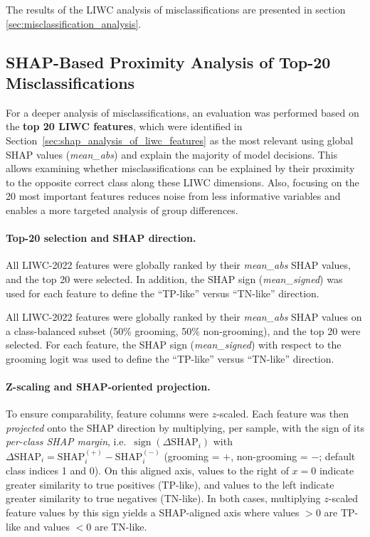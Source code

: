 The results of the LIWC analysis of misclassifications are presented in section \ref{sec:misclassification_analysis}.

\subsection{SHAP-Based Proximity Analysis of Top-20 Misclassifications}


For a deeper analysis of misclassifications, an evaluation was performed based on the \textbf{top 20 LIWC features}, which were identified in Section~\ref{sec:shap_analysis_of_liwc_features} as the most relevant using global SHAP values (\emph{mean\_abs}) and explain the majority of model decisions. This allows examining whether misclassifications can be explained by their proximity to the opposite correct class along these LIWC dimensions. Also, focusing on the 20 most important features reduces noise from less informative variables and enables a more targeted analysis of group differences.

\paragraph{Top-20 selection and SHAP direction.}
All LIWC-2022 features were globally ranked by their \emph{mean\_abs} SHAP values, and the top 20 were selected. In addition, the SHAP sign (\emph{mean\_signed}) was used for each feature to define the “TP-like” versus “TN-like” direction.

All LIWC-2022 features were globally ranked by their \emph{mean\_abs} SHAP values on a class-balanced subset (50\% grooming, 50\% non-grooming), and the top 20 were selected. For each feature, the SHAP sign (\emph{mean\_signed}) with respect to the grooming logit was used to define the “TP-like” versus “TN-like” direction.

\paragraph{Z-scaling and SHAP-oriented projection.}
To ensure comparability, feature columns were $z$-scaled. Each feature was then \emph{projected} onto the SHAP direction by multiplying, per sample, with the sign of its \emph{per-class SHAP margin}, i.e.\ $\operatorname{sign}(\Delta\mathrm{SHAP}_i)$ with
$\Delta\mathrm{SHAP}_i = \mathrm{SHAP}^{(+)}_i - \mathrm{SHAP}^{(-)}_i$ (grooming = $+$, non-grooming = $-$; default class indices 1 and 0). On this aligned axis, values to the right of $x=0$ indicate greater similarity to true positives (TP-like), and values to the left indicate greater similarity to true negatives (TN-like). In both cases, multiplying $z$-scaled feature values by this sign yields a SHAP-aligned axis where values $>0$ are TP-like and values $<0$ are TN-like.


